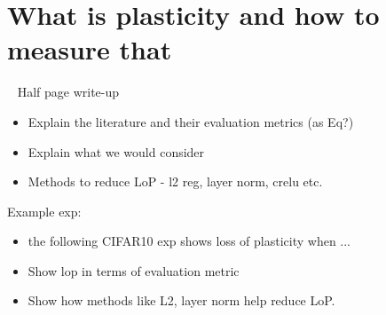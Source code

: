 \section{What is plasticity and how to measure that}

~ Half page write-up
\begin{itemize}
    \item Explain the literature and their evaluation metrics (as Eq?)
    \item Explain what we would consider
    \item Methods to reduce LoP - l2 reg, layer norm, crelu etc.
\end{itemize}


Example exp:
\begin{itemize}
    \item the following CIFAR10 exp shows loss of plasticity when ...
    \item Show lop in terms of evaluation metric
    \item Show how methods like L2, layer norm help reduce LoP.
\end{itemize}
